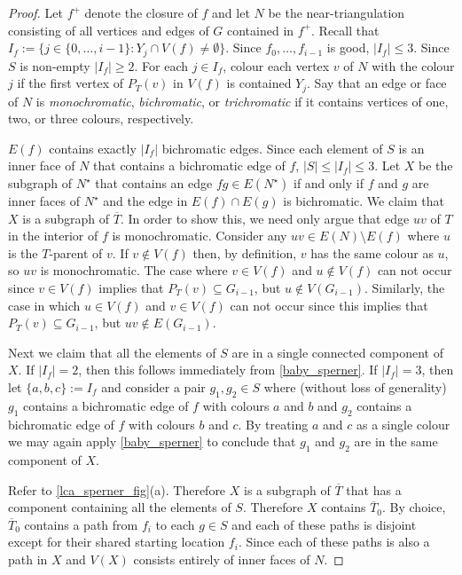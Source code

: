 \documentclass{patmorin}
\begin{document}
\begin{proof}
  Let $f^+$ denote the closure of $f$ and let $N$ be the near-triangulation consisting of all vertices and edges of $G$ contained in $f^+$.  Recall that $I_f:=\{j\in\{0,\ldots,i-1\}: Y_j\cap V(f)\neq\emptyset\}$.  Since $f_0,\ldots,f_{i-1}$ is good, $|I_f|\le 3$.  Since $S$ is non-empty $|I_f|\ge 2$.  For each $j\in I_f$, colour each vertex $v$ of $N$ with the colour $j$ if the first vertex of $P_{T}(v)$ in $V(f)$ is contained $Y_j$.  Say that an edge or face of $N$ is \emph{monochromatic}, \emph{bichromatic}, or \emph{trichromatic} if it contains vertices of one, two, or three colours, respectively.

  $E(f)$ contains exactly $|I_f|$ bichromatic edges.  Since each element of $S$ is an inner face of $N$ that contains a bichromatic edge of $f$, $|S|\le |I_f|\le 3$.  Let $X$ be the subgraph of $N^\star$ that contains an edge $fg\in E(N^\star)$ if and only if $f$ and $g$ are inner faces of $N^\star$ and the edge in $E(f)\cap E(g)$ is bichromatic.  We claim that $X$ is a subgraph of $\overline{T}$.  In order to show this, we need only argue that edge $uv$ of $T$ in the interior of $f$ is monochromatic.  Consider any $uv\in E(N)\setminus E(f)$ where $u$ is the $T$-parent of $v$.  If $v\not\in V(f)$ then, by definition, $v$ has the same colour as $u$, so $uv$ is monochromatic. The case where $v\in V(f)$ and $u\not\in V(f)$ can not occur since $v\in V(f)$ implies that $P_T(v)\subseteq G_{i-1}$, but $u\not\in V(G_{i-1})$.  Similarly, the case in which $u\in V(f)$ and $v\in V(f)$ can not occur since this implies that $P_T(v)\subseteq G_{i-1}$, but $uv\not\in E(G_{i-1})$.

  Next we claim that all the elements of $S$ are in a single connected component of $X$.  If $|I_f|=2$, then this follows immediately from \cref{baby_sperner}.  If $|I_f|=3$, then let $\{a,b,c\}:=I_f$ and consider a pair $g_1,g_2\in S$ where (without loss of generality) $g_1$ contains a bichromatic edge of $f$ with colours $a$ and $b$ and $g_2$ contains a bichromatic edge of $f$ with colours $b$ and $c$.  By treating $a$ and $c$ as a single colour we may again apply \cref{baby_sperner} to conclude that $g_1$ and $g_2$ are in the same component of $X$.

  Refer to \cref{lca_sperner_fig}(a).
  Therefore $X$ is a subgraph of $\overline{T}$ that has a component containing all the elements of $S$. Therefore $X$ contains $\overline{T}_0$.  By choice, $\overline{T}_0$ contains a path from $f_i$ to each $g\in S$ and each of these paths is disjoint except for their shared starting location $f_i$. Since each of these paths is also a path in $X$ and $V(X)$ consists entirely of inner faces of $N$.


\end{proof}
\end{document}
